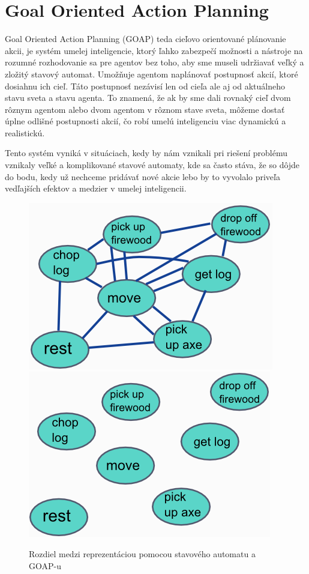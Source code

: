 \section{Goal Oriented Action Planning}
Goal Oriented Action Planning (GOAP) teda cieľovo orientované plánovanie akcii, je systém umelej inteligencie, ktorý ľahko zabezpečí možnosti a nástroje na rozumné rozhodovanie sa pre agentov bez toho, aby sme museli udržiavať veľký a zložitý stavový automat. Umožňuje agentom naplánovať postupnosť akcií, ktoré dosiahnu ich cieľ. Táto postupnosť nezávisí len od cieľa ale aj od aktuálneho stavu sveta a stavu agenta. To znamená, že ak by sme dali rovnaký cieľ dvom rôznym agentom alebo dvom agentom v rôznom stave sveta, môžeme dostať úplne odlišné postupnosti akcií, čo robí umelú inteligenciu viac dynamickú a realistickú.\par
Tento systém vyniká v situáciach, kedy by nám vznikali pri riešení problému vznikaly veľké a komplikované stavové automaty, kde sa často stáva, že so dôjde do bodu, kedy už nechceme pridávať nové akcie lebo by to vyvolalo priveľa vedľajších efektov a medzier v umelej inteligencii.
\begin{figure}[H] 
\begin{center}
\includegraphics[scale=0.65]{img/fsm_states.png} \hspace{0.5cm}
\includegraphics[scale=0.65]{img/goap_states.png}
\caption{Rozdiel medzi reprezentáciou pomocou stavového automatu a GOAP-u\cite{goap}}
\label{fig:ch22}
\end{center}
\end{figure}
